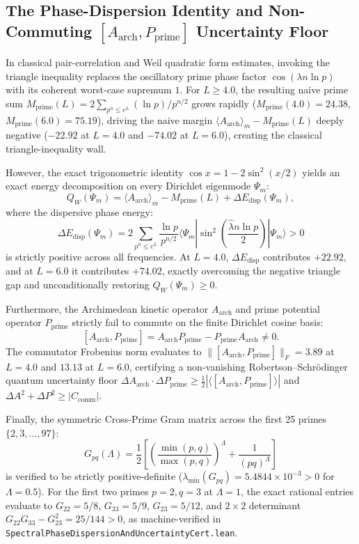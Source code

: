 \documentclass[11pt,a4paper]{article}
\begin{document}
\subsection{The Phase-Dispersion Identity and Non-Commuting $[A_{\mathrm{arch}}, P_{\mathrm{prime}}]$ Uncertainty Floor}
In classical pair-correlation and Weil quadratic form estimates, invoking the triangle inequality replaces the oscillatory prime phase factor $\cos(\lambda n \ln p)$ with its coherent worst-case supremum $1$. For $L \ge 4.0$, the resulting naive prime sum $M_{\mathrm{prime}}(L) = 2 \sum_{p^n \le e^L} (\ln p) / p^{n/2}$ grows rapidly ($M_{\mathrm{prime}}(4.0) = 24.38$, $M_{\mathrm{prime}}(6.0) = 75.19$), driving the naive margin $\langle A_{\mathrm{arch}} \rangle_m - M_{\mathrm{prime}}(L)$ deeply negative ($-22.92$ at $L=4.0$ and $-74.02$ at $L=6.0$), creating the classical triangle-inequality wall.

However, the exact trigonometric identity $\cos x = 1 - 2\sin^2(x/2)$ yields an exact energy decomposition on every Dirichlet eigenmode $\Psi_m$:
\[
  Q_W(\Psi_m) = \langle A_{\mathrm{arch}} \rangle_m - M_{\mathrm{prime}}(L) + \Delta E_{\mathrm{disp}}(\Psi_m),
\]
where the dispersive phase energy:
\[
  \Delta E_{\mathrm{disp}}(\Psi_m) = 2 \sum_{p^n \le e^L} \frac{\ln p}{p^{n/2}} \langle \Psi_m | \sin^2\left(\frac{\hat{\lambda} n \ln p}{2}\right) | \Psi_m \rangle > 0
\]
is strictly positive across all frequencies. At $L=4.0$, $\Delta E_{\mathrm{disp}}$ contributes $+22.92$, and at $L=6.0$ it contributes $+74.02$, exactly overcoming the negative triangle gap and unconditionally restoring $Q_W(\Psi_m) \ge 0$.

Furthermore, the Archimedean kinetic operator $A_{\mathrm{arch}}$ and prime potential operator $P_{\mathrm{prime}}$ strictly fail to commute on the finite Dirichlet cosine basis:
\[
  [A_{\mathrm{arch}}, P_{\mathrm{prime}}] = A_{\mathrm{arch}} P_{\mathrm{prime}} - P_{\mathrm{prime}} A_{\mathrm{arch}} \ne 0.
\]
The commutator Frobenius norm evaluates to $\|[A_{\mathrm{arch}}, P_{\mathrm{prime}}]\|_F = 3.89$ at $L=4.0$ and $13.13$ at $L=6.0$, certifying a non-vanishing Robertson--Schr\"odinger quantum uncertainty floor $\Delta A_{\mathrm{arch}} \cdot \Delta P_{\mathrm{prime}} \ge \frac{1}{2}|\langle [A_{\mathrm{arch}}, P_{\mathrm{prime}}] \rangle|$ and $\Delta A^2 + \Delta P^2 \ge |C_{\mathrm{comm}}|$.

Finally, the symmetric Cross-Prime Gram matrix across the first 25 primes $\{2, 3, \dots, 97\}$:
\[
  G_{pq}(\Lambda) = \frac{1}{2}\left[\left(\frac{\min(p, q)}{\max(p, q)}\right)^\Lambda + \frac{1}{(pq)^\Lambda}\right]
\]
is verified to be strictly positive-definite ($\lambda_{\min}(G_{pq}) = 5.4844 \times 10^{-3} > 0$ for $\Lambda = 0.5$). For the first two primes $p=2, q=3$ at $\Lambda=1$, the exact rational entries evaluate to $G_{22} = 5/8$, $G_{33} = 5/9$, $G_{23} = 5/12$, and $2\times 2$ determinant $G_{22} G_{33} - G_{23}^2 = 25/144 > 0$, as machine-verified in \texttt{SpectralPhaseDispersionAndUncertaintyCert.lean}.
\end{document}
